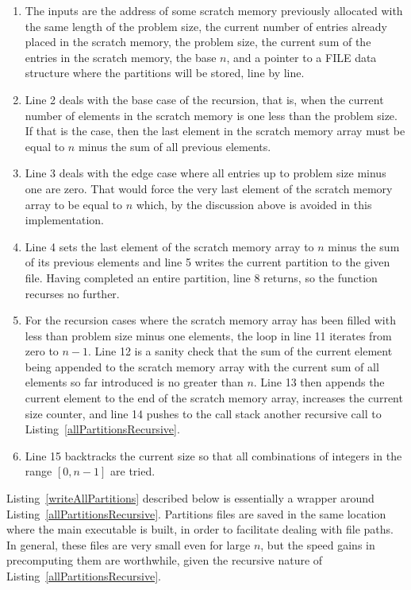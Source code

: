 \begin{enumerate}
\item The inputs are the address of some scratch memory previously allocated with the same length of the problem size, the current number of entries already placed in the scratch memory, the problem size, the current sum of the entries in the scratch memory, the base $n$, and a pointer to a FILE data structure where the partitions will be stored, line by line.
\item Line 2 deals with the base case of the recursion, that is, when the current number of elements in the scratch memory is one less than the problem size. If that is the case, then the last element in the scratch memory array must be equal to $n$ minus the sum of all previous elements.
\item Line 3 deals with the edge case where all entries up to problem size minus one are zero. That would force the very last element of the scratch memory array to be equal to $n$ which, by the discussion above is avoided in this implementation.
\item Line 4 sets the last element of the scratch memory array to $n$ minus the sum of its previous elements and line 5 writes the current partition to the given file. Having completed an entire partition, line 8 returns, so the function recurses no further.
\addtocounter{enumi}{6}
\item For the recursion cases where the scratch memory array has been filled with less than problem size minus one elements, the loop in line 11 iterates from zero to $n - 1$. Line 12 is a sanity check that the sum of the current element being appended to the scratch memory array with the current sum of all elements so far introduced is no greater than $n$. Line 13 then appends the current element to the end of the scratch memory array, increases the current size counter, and line 14 pushes to the call stack another recursive call to Listing~\ref{allPartitionsRecursive}.
\addtocounter{enumi}{3}
\item Line 15 backtracks the current size so that all combinations of integers in the range $[0, n - 1]$ are tried.
\end{enumerate}

Listing~\ref{writeAllPartitions} described below is essentially a wrapper around Listing~\ref{allPartitionsRecursive}. Partitions files are saved in the same location where the main executable is built, in order to facilitate dealing with file paths. In general, these files are very small even for large $n$, but the speed gains in precomputing them are worthwhile, given the recursive nature of Listing~\ref{allPartitionsRecursive}.

